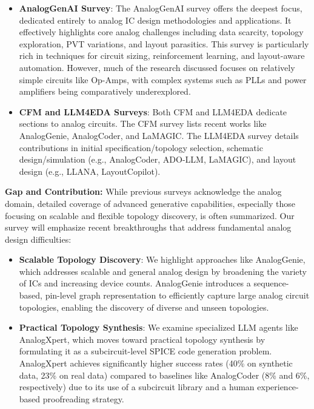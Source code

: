 \documentclass{ieeeaccess}
\begin{document}
\begin{itemize}
    \item \textbf{AnalogGenAI Survey}: The AnalogGenAI survey offers the deepest focus, dedicated entirely to analog IC design methodologies and applications. It effectively highlights core analog challenges including data scarcity, topology exploration, PVT variations, and layout parasitics. This survey is particularly rich in techniques for circuit sizing, reinforcement learning, and layout-aware automation. However, much of the research discussed focuses on relatively simple circuits like Op-Amps, with complex systems such as PLLs and power amplifiers being comparatively underexplored.
    \item \textbf{CFM and LLM4EDA Surveys}: Both CFM and LLM4EDA dedicate sections to analog circuits. The CFM survey lists recent works like AnalogGenie, AnalogCoder, and LaMAGIC. The LLM4EDA survey details contributions in initial specification/topology selection, schematic design/simulation (e.g., AnalogCoder, ADO-LLM, LaMAGIC), and layout design (e.g., LLANA, LayoutCopilot).
\end{itemize}

\textbf{Gap and Contribution:} While previous surveys acknowledge the analog domain, detailed coverage of advanced generative capabilities, especially those focusing on scalable and flexible topology discovery, is often summarized. Our survey will emphasize recent breakthroughs that address fundamental analog design difficulties:
\begin{itemize}
\item \textbf{Scalable Topology Discovery}: We highlight approaches like AnalogGenie, which addresses scalable and general analog design by broadening the variety of ICs and increasing device counts. AnalogGenie introduces a sequence-based, pin-level graph representation to efficiently capture large analog circuit topologies, enabling the discovery of diverse and unseen topologies.
\item \textbf{Practical Topology Synthesis}: We examine specialized LLM agents like AnalogXpert, which moves toward practical topology synthesis by formulating it as a subcircuit-level SPICE code generation problem. AnalogXpert achieves significantly higher success rates (40\% on synthetic data, 23\% on real data) compared to baselines like AnalogCoder (8\% and 6\%, respectively) due to its use of a subcircuit library and a human experience-based proofreading strategy.
\end{itemize}
\end{document}
